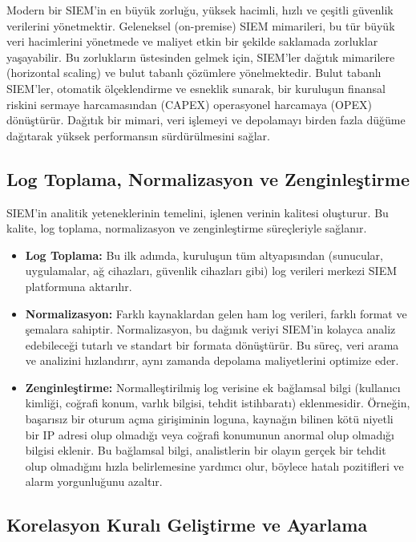 Modern bir SIEM'in en büyük zorluğu, yüksek hacimli, hızlı ve çeşitli güvenlik verilerini yönetmektir. Geleneksel (on-premise) SIEM mimarileri, bu tür büyük veri hacimlerini yönetmede ve maliyet etkin bir şekilde saklamada zorluklar yaşayabilir. Bu zorlukların üstesinden gelmek için, SIEM'ler dağıtık mimarilere (horizontal scaling) ve bulut tabanlı çözümlere yönelmektedir. Bulut tabanlı SIEM'ler, otomatik ölçeklendirme ve esneklik sunarak, bir kuruluşun finansal riskini sermaye harcamasından (CAPEX) operasyonel harcamaya (OPEX) dönüştürür. Dağıtık bir mimari, veri işlemeyi ve depolamayı birden fazla düğüme dağıtarak yüksek performansın sürdürülmesini sağlar.

\subsection{Log Toplama, Normalizasyon ve Zenginleştirme}

SIEM'in analitik yeteneklerinin temelini, işlenen verinin kalitesi oluşturur. Bu kalite, log toplama, normalizasyon ve zenginleştirme süreçleriyle sağlanır.

\begin{itemize}
    \item \textbf{Log Toplama:} Bu ilk adımda, kuruluşun tüm altyapısından (sunucular, uygulamalar, ağ cihazları, güvenlik cihazları gibi) log verileri merkezi SIEM platformuna aktarılır.
    \item \textbf{Normalizasyon:} Farklı kaynaklardan gelen ham log verileri, farklı format ve şemalara sahiptir. Normalizasyon, bu dağınık veriyi SIEM'in kolayca analiz edebileceği tutarlı ve standart bir formata dönüştürür. Bu süreç, veri arama ve analizini hızlandırır, aynı zamanda depolama maliyetlerini optimize eder.
    \item \textbf{Zenginleştirme:} Normalleştirilmiş log verisine ek bağlamsal bilgi (kullanıcı kimliği, coğrafi konum, varlık bilgisi, tehdit istihbaratı) eklenmesidir. Örneğin, başarısız bir oturum açma girişiminin loguna, kaynağın bilinen kötü niyetli bir IP adresi olup olmadığı veya coğrafi konumunun anormal olup olmadığı bilgisi eklenir. Bu bağlamsal bilgi, analistlerin bir olayın gerçek bir tehdit olup olmadığını hızla belirlemesine yardımcı olur, böylece hatalı pozitifleri ve alarm yorgunluğunu azaltır.
\end{itemize}

\subsection{Korelasyon Kuralı Geliştirme ve Ayarlama}

